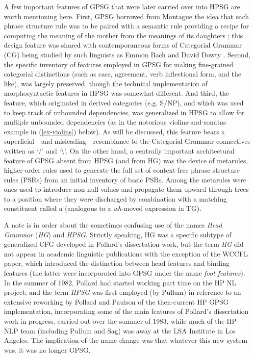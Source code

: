 \documentclass[output=paper,biblatex,babelshorthands,newtxmath,draftmode,colorlinks,citecolor=brown]{langscibook}
\begin{document}
A few important features of GPSG that were later carried over into HPSG are worth mentioning
here. First, GPSG borrowed from Montague the idea that each phrase structure rule was to be paired
with a semantic rule providing a recipe for computing the meaning of the mother from the meanings of
its daughters \citep[]{Gazdar81a}; this design feature was shared with contemporaneous
forms of Categorial Grammar (CG) being studied by such linguists as Emmon Bach
\citep{Bach79a,Bach80a} and David Dowty \citep{Dowty82a-u,Dowty82b}.  Second, the specific inventory
of features employed in GPSG for making fine-grained categorial distinctions (such as case,
agreement, verb inflectional form, and the like), was largely preserved, though the technical
implementation of morphosyntactic features in HPSG was somewhat different. And third, the \slasch
feature, which originated in  derived categories (e.g. S/NP), and which was used
to keep track of unbounded dependencies, was generalized in HPSG to allow
for multiple unbounded dependencies (as in the notorious violins-and-sonatas example in
(\ref{ex-violins}) below). As will be discussed, this \slasch feature bears a superficial---and
misleading---resemblance to the Categorial Grammar connectives written as `/' and
`\textbackslash'. On the other hand, a centrally important architectural feature of GPSG absent from
HPSG (and from HG) was the device of metarules, higher-order rules used to generate the
full set of context-free phrase structure rules (PSRs) from an initial inventory of basic
PSRs. Among the metarules were ones used to introduce non-null \slasch values and propagate them
upward through trees to a position where they were discharged by combination with a matching
constituent called a  (analogous to a \emph{wh}-moved expression in TG).

A note is in order about the sometimes confusing use of the names \emph{Head Grammar} (\emph{HG})
and \emph{HPSG}. Strictly speaking, HG was a specific subtype of generalized CFG developed in
Pollard's dissertation work, but the term \emph{HG} did not appear in academic linguistic
publications with the exception of the \citet{PollardSag1983} WCCFL paper, which introduced the
distinction between head features and binding features (the latter were incorporated into GPSG under
the name \emph{foot features}). In the summer of 1982, Pollard had started working part time on the
HP NL project; and the term \emph{HPSG} was first employed (by Pullum) in reference to an extensive
reworking by Pollard and Paulson of the then-current HP GPSG implementation, incorporating some of
the main features of Pollard's dissertation work in progress, carried out over the summer of 1983,
while much of the HP NLP team (including Pullum and Sag) was away at the LSA Institute in Los
Angeles.  The implication of the name change was that whatever this new system was, it was no longer
GPSG.
\end{document}
